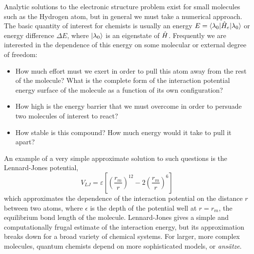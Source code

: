 Analytic solutions to the electronic structure problem exist for small molecules such as the Hydrogen atom, but in general we must take a numerical approach.
The basic quantity of interest for chemists is usually an energy 
$E=\mbox{$ \langle \lambda_0 | $} \hat{H}_e \mbox{$ | \lambda_0 \rangle $}$
or energy difference $\Delta E$, where $\mbox{$ | \lambda_0 \rangle $}$ is an eigenstate of $\hat{H}$. Frequently we are interested in the dependence of this energy on some molecular or external degree of freedom:
\begin{itemize}
    \item How much effort must we exert in order to pull this atom away from the rest of the molecule? What is the complete form of the interaction potential energy surface of the molecule as a function of its own configuration?
    \item How high is the energy barrier that we must overcome in order to persuade two molecules of interest to react?
    \item How stable is this compound? How much energy would it take to pull it apart?
\end{itemize}
An example of a very simple approximate solution to such questions is the Lennard-Jones potential,
\begin{equation}
V_{LJ} = \varepsilon \left[  \left( \frac {r_{m}} {r} \right)^{12} - 2\left( \frac {r_{m}} {r} \right)^6 \right] 
\end{equation}
which approximates the dependence of the interaction potential on the distance $r$ between two atoms, where $\epsilon$ is the depth of the potential well at $r=r_m$, the equilibrium bond length of the molecule. 
Lennard-Jones gives a simple and computationally frugal estimate of the interaction energy, but its approximation breaks down for a broad variety of chemical systems. For larger, more complex molecules, quantum chemists depend on more sophisticated models, or \emph{ans\"atze}.

